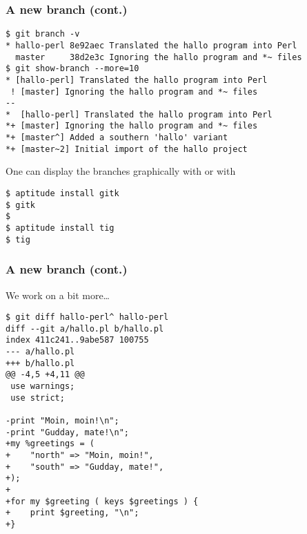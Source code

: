 \begin{frame}[fragile]
\frametitle{A new branch (cont.)}

\begin{lstlisting}
$ git branch -v
* hallo-perl 8e92aec Translated the hallo program into Perl
  master     38d2e3c Ignoring the hallo program and *~ files
$ git show-branch --more=10
* [hallo-perl] Translated the hallo program into Perl
 ! [master] Ignoring the hallo program and *~ files
--
*  [hallo-perl] Translated the hallo program into Perl
*+ [master] Ignoring the hallo program and *~ files
*+ [master^] Added a southern 'hallo' variant
*+ [master~2] Initial import of the hallo project
\end{lstlisting}

One can display the branches graphically with  or with
\begin{lstlisting}
$ aptitude install gitk
$ gitk
$
$ aptitude install tig
$ tig
\end{lstlisting}
\end{frame}

\begin{frame}[fragile]
\frametitle{A new branch (cont.)}

We work on  a bit more\ldots
\begin{lstlisting}
$ git diff hallo-perl^ hallo-perl
diff --git a/hallo.pl b/hallo.pl
index 411c241..9abe587 100755
--- a/hallo.pl
+++ b/hallo.pl
@@ -4,5 +4,11 @@
 use warnings;
 use strict;
 
-print "Moin, moin!\n";
-print "Gudday, mate!\n";
+my %greetings = (
+    "north" => "Moin, moin!",
+    "south" => "Gudday, mate!",
+);
+
+for my $greeting ( keys $greetings ) {
+    print $greeting, "\n";
+}
\end{lstlisting}
\end{frame}

